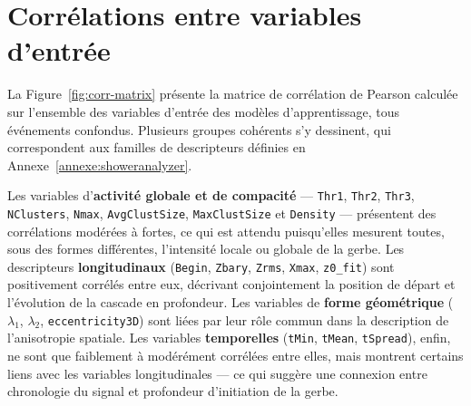 \begin{table}[!ht]
    \centering
    \caption{Comparaison qualitative des signatures calorimétriques moyennes attendues dans le SDHCAL.}
    \label{tab:comparaison-signatures}
    \renewcommand{\arraystretch}{1.4}
\end{table}

\section{Corrélations entre variables d'entrée}
\label{app:correlations}

La Figure~\ref{fig:corr-matrix} présente la matrice de corrélation de Pearson calculée sur
l'ensemble des variables d'entrée des modèles d'apprentissage, tous événements confondus. Plusieurs
groupes cohérents s'y dessinent, qui correspondent aux familles de descripteurs définies en
Annexe~\ref{annexe:showeranalyzer}.

Les variables d'\textbf{activité globale et de compacité} — \texttt{Thr1}, \texttt{Thr2},
\texttt{Thr3}, \texttt{NClusters}, \texttt{Nmax}, \texttt{AvgClustSize}, \texttt{MaxClustSize} et
\texttt{Density} — présentent des corrélations modérées à fortes, ce qui est attendu puisqu'elles
mesurent toutes, sous des formes différentes, l'intensité locale ou globale de la gerbe. Les
descripteurs \textbf{longitudinaux} (\texttt{Begin}, \texttt{Zbary}, \texttt{Zrms}, \texttt{Xmax},
\texttt{z0\_fit}) sont positivement corrélés entre eux, décrivant conjointement la position de départ
et l'évolution de la cascade en profondeur. Les variables de \textbf{forme géométrique}
(\(\lambda_1\), \(\lambda_2\), \texttt{eccentricity3D}) sont liées par leur rôle commun dans la
description de l'anisotropie spatiale. Les variables \textbf{temporelles} (\texttt{tMin},
\texttt{tMean}, \texttt{tSpread}), enfin, ne sont que faiblement à modérément corrélées entre elles,
mais montrent certains liens avec les variables longitudinales — ce qui suggère une connexion entre
chronologie du signal et profondeur d'initiation de la gerbe.

